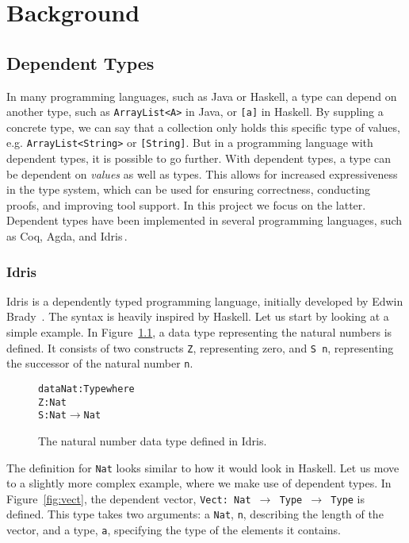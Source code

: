 \chapter{Background}
\label{chap:Background}
\section{Dependent Types}
\label{sec:DependentTypes}
In many programming languages, such as Java or Haskell, a type can depend on another type, such as \texttt{ArrayList<A>} in Java, or \texttt{[a]} in Haskell. By suppling a concrete type, we can say that a collection only holds this specific type of values, e.g. \texttt{ArrayList<String>} or \texttt{[String]}. But in a programming language with dependent types, it is possible to go further. With dependent types, a type can be dependent on \emph{values} as well as types. This allows for increased expressiveness in the type system, which can be used for ensuring correctness, conducting proofs, and improving tool support. In this project we focus on the latter. Dependent types have been implemented in several programming languages, such as Coq\cite{Coq}, Agda\cite{Agda}, and
Idris\,\cite{Idris}.

\subsection{Idris}
\label{subsec:Idris}
Idris is a dependently typed programming language, initially developed by Edwin Brady~\cite{Idris}. The syntax is heavily inspired by Haskell. Let us start by looking at a simple example. In Figure~\ref{fig:nat}, a data type representing the natural numbers is defined. It consists of two constructs \texttt{Z}, representing zero, and \texttt{S~n}, representing the successor of the natural number \texttt{n}.

\begin{figure}
\begin{alltt}
data Nat : Type where
  Z : Nat
  S : Nat \(\to\) Nat
\end{alltt}
\caption{The natural number data type defined in Idris.}
\label{fig:nat}
\end{figure}

The definition for \texttt{Nat} looks similar to how it would look in Haskell. Let us move to a slightly more complex example, where we make use of dependent types. In Figure~\ref{fig:vect}, the dependent vector, \texttt{Vect: Nat $\to$ Type $\to$ Type} is defined. This type takes two arguments: a \texttt{Nat}, \texttt{n}, describing the length of the vector, and a type, \texttt{a}, specifying the type of the elements it contains.

